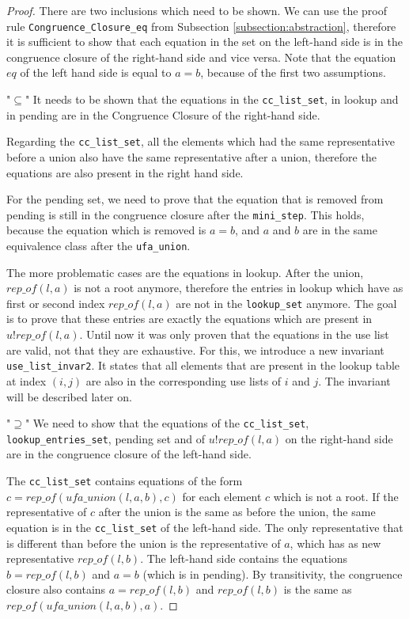\begin{proof}
There are two inclusions which need to be shown. We can use the proof rule \lstinline{Congruence_Closure_eq} from Subsection \ref{subsection:abstraction}, therefore it is sufficient to show that each equation in the set on the left-hand side is in the congruence closure of the right-hand side and vice versa. Note that the equation $eq$ of the left hand side is equal to $a = b$, because of the first two assumptions.

"$\subseteq$" It needs to be shown that the equations in the \lstinline{cc_list_set}, in lookup and in pending are in the Congruence Closure of the right-hand side.

Regarding the \lstinline{cc_list_set}, all the elements which had the same representative before a union also have the same representative after a union, therefore the equations are also present in the right hand side.

For the pending set, we need to prove that the equation that is removed from pending is still in the congruence closure after the \lstinline{mini_step}. This holds, because the equation which is removed is $a = b$, and $a$ and $b$ are in the same equivalence class after the \lstinline{ufa_union}.

The more problematic cases are the equations in lookup. After the union, $rep\_of(l, a)$ is not a root anymore, therefore the entries in lookup which have as first or second index $rep\_of(l, a)$ are not in the \lstinline{lookup_set} anymore.
The goal is to prove that these entries are exactly the equations which are present in $u ! rep\_of(l, a)$. Until now it was only proven that the equations in the use list are valid, not that they are exhaustive.
For this, we introduce a new invariant \lstinline{use_list_invar2}.
It states that all elements that are present in the lookup table at index $(i, j)$ are also in the corresponding use lists of $i$ and $j$. The invariant will be described later on.

"$\supseteq$" We need to show that the equations of the \lstinline{cc_list_set}, \lstinline{lookup_entries_set}, pending set and of $u ! rep\_of(l, a)$ on the right-hand side are in the congruence closure of the left-hand side.

The \lstinline{cc_list_set} contains equations of the form $c = rep\_of (ufa\_union(l, a, b), c)$ for each element $c$ which is not a root.
If the representative of $c$ after the union is the same as before the union, the same equation is in the \lstinline{cc_list_set} of the left-hand side.
The only representative that is different than before the union is the representative of $a$, which has as new representative $rep\_of(l, b)$.
The left-hand side contains the equations $b = rep\_of(l, b)$ and $a = b$ (which is in pending).
By transitivity, the congruence closure also contains $a = rep\_of(l, b)$ and $rep\_of(l, b)$ is the same as $rep\_of (ufa\_union(l, a, b), a)$.


\end{proof}
